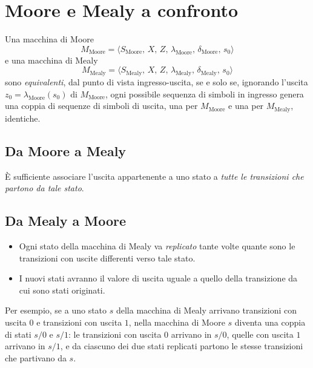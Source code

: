\documentclass[11pt,a4paper]{article}
\begin{document}
\section{Moore e Mealy a confronto}

Una macchina di Moore
\[
M_{\text{Moore}} = \langle S_{\text{Moore}},\, X,\, Z,\, \lambda_{\text{Moore}},\, \delta_{\text{Moore}},\, s_0\rangle
\]
e una macchina di Mealy
\[
M_{\text{Mealy}} = \langle S_{\text{Mealy}},\, X,\, Z,\, \lambda_{\text{Mealy}},\, \delta_{\text{Mealy}},\, s_0\rangle
\]
sono \emph{equivalenti}, dal punto di vista ingresso-uscita, se e solo se, ignorando l'uscita $z_0 = \lambda_{\text{Moore}}(s_0)$ di $M_{\text{Moore}}$, ogni possibile sequenza di simboli in ingresso genera una coppia di sequenze di simboli di uscita, una per $M_{\text{Moore}}$ e una per $M_{\text{Mealy}}$, identiche.

\subsection{Da Moore a Mealy}

È sufficiente associare l'uscita appartenente a uno stato a \emph{tutte le transizioni che partono da tale stato}.

\begin{center}
\end{center}

\subsection{Da Mealy a Moore}

\begin{itemize}
    \item Ogni stato della macchina di Mealy va \emph{replicato} tante volte quante sono le transizioni con uscite differenti verso tale stato.
    \item I nuovi stati avranno il valore di uscita uguale a quello della transizione da cui sono stati originati.
\end{itemize}
Per esempio, se a uno stato $s$ della macchina di Mealy arrivano transizioni con uscita $0$ e transizioni con uscita $1$, nella macchina di Moore $s$ diventa una coppia di stati $s/0$ e $s/1$: le transizioni con uscita $0$ arrivano in $s/0$, quelle con uscita $1$ arrivano in $s/1$, e da ciascuno dei due stati replicati partono le stesse transizioni che partivano da $s$.
\end{document}
